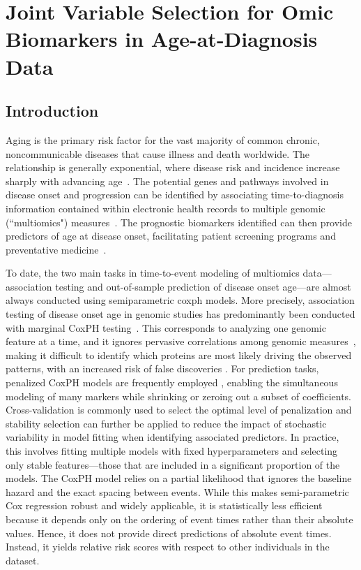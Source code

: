 \chapter[Joint Variable Selection for Omic Biomarkers in Age-at-Diagnosis Data][Joint Variable Selection for Omic Biomarkers]{Joint Variable Selection for Omic Biomarkers in Age-at-Diagnosis Data}
\label{ch:vampw}

\section{Introduction}
\label{sec:intro}
Aging is the primary risk factor for the vast majority of common chronic, noncommunicable diseases that cause illness and death worldwide. The relationship is generally exponential, where disease risk and incidence increase sharply with advancing age~\cite{Kopp2024-hy}. The potential genes and pathways involved in disease onset and progression can be identified by associating time-to-diagnosis information contained within electronic health records to multiple genomic (``multiomics") measures~\cite{gadd_blood_2024, sun_plasma_2023}. The prognostic biomarkers identified can then provide predictors of age at disease onset, facilitating patient screening programs and preventative medicine~\cite{gadd_blood_2024, sun_plasma_2023}.

To date, the two main tasks in time-to-event modeling of multiomics data---association testing and out-of-sample prediction of disease onset age---are almost always conducted using semiparametric \acrfull{coxph} models. More precisely, association testing of disease onset age in genomic studies has predominantly been conducted with marginal CoxPH testing~\cite{gadd_blood_2024,gong_unraveling_2025,deng_atlas_2025}. This corresponds to analyzing one genomic feature at a time, and it ignores pervasive correlations among genomic measures~\cite{argentieri_proteomic_2024}, making it difficult to identify which proteins are most likely driving the observed patterns, with an increased risk of false discoveries \cite{fan_stable_2024}. For prediction tasks, penalized CoxPH models \cite{tibshirani_lasso_1997} are frequently employed \cite{gadd_blood_2024,kuo_proteomic_2025}, enabling the simultaneous modeling of many markers while shrinking or zeroing out a subset of coefficients. Cross-validation is commonly used to select the optimal level of penalization and stability selection \cite{meinshausen_stability_2010} can further be applied to reduce the impact of stochastic variability in model fitting when identifying associated predictors. In practice, this involves fitting multiple models with fixed hyperparameters and selecting only stable features—those that are included in a significant proportion of the models. The CoxPH model relies on a partial likelihood that ignores the baseline hazard and the exact spacing between events. While this makes semi-parametric Cox regression robust and widely applicable, it is statistically less efficient because it depends only on the ordering of event times rather than their absolute values. Hence, it does not provide direct predictions of absolute event times. Instead, it yields relative risk scores with respect to other individuals in the dataset. 

